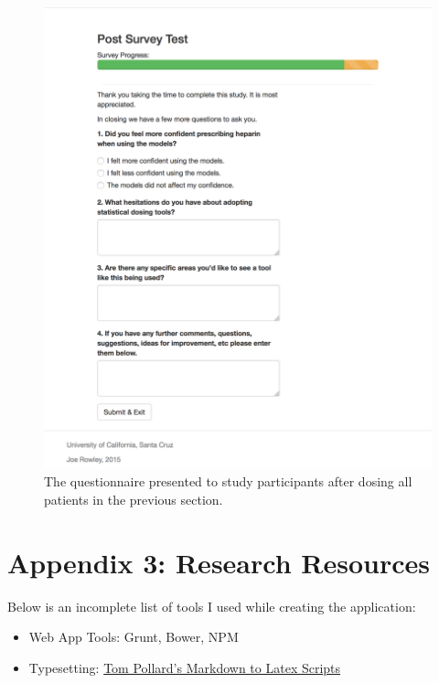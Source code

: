 \documentclass[12pt,a4paper,]{report}
\providecommand{\tightlist}{%
  \setlength{\itemsep}{0pt}\setlength{\parskip}{0pt}}
\begin{document}
\begin{figure}[H]
\noindent
\includegraphics[width=1\textwidth]{source/figures/postsurvey.png}
\caption{\label{fig:postsurvey}The questionnaire presented to study participants after dosing all patients in the previous section.}
\end{figure}

\newpage

\chapter*{Appendix 3: Research
Resources}\label{appendix-3-research-resources}

Below is an incomplete list of tools I used while creating the
application:

\begin{itemize}
\tightlist
\item
  Web App Tools: Grunt, Bower, NPM
\item
  Typesetting:
  \href{https://github.com/tompollard/phd_thesis_markdown}{Tom Pollard's
  Markdown to Latex Scripts}
\end{itemize}
\end{document}
